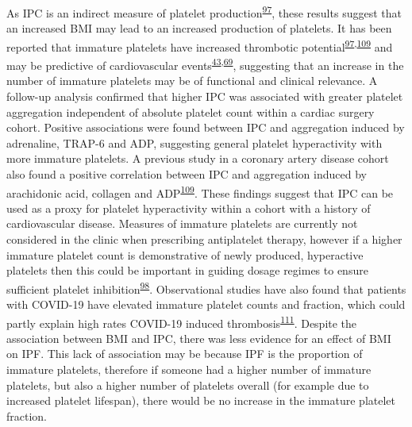 \documentclass[11pt,twoside]{bristolthesis}
\begin{document}
As IPC is an indirect measure of platelet production\textsuperscript{\protect\hyperlink{ref-Lev2016a}{97}}, these results suggest that an increased BMI may lead to an increased production of platelets. It has been reported that immature platelets have increased thrombotic potential\textsuperscript{\protect\hyperlink{ref-Lev2016a}{97},\protect\hyperlink{ref-Grove2011a}{109}} and may be predictive of cardiovascular events\textsuperscript{\protect\hyperlink{ref-Freynhofer2017a}{43},\protect\hyperlink{ref-Ibrahim2014}{69}}, suggesting that an increase in the number of immature platelets may be of functional and clinical relevance. A follow-up analysis confirmed that higher IPC was associated with greater platelet aggregation independent of absolute platelet count within a cardiac surgery cohort. Positive associations were found between IPC and aggregation induced by adrenaline, TRAP-6 and ADP, suggesting general platelet hyperactivity with more immature platelets. A previous study in a coronary artery disease cohort also found a positive correlation between IPC and aggregation induced by arachidonic acid, collagen and ADP\textsuperscript{\protect\hyperlink{ref-Grove2011a}{109}}. These findings suggest that IPC can be used as a proxy for platelet hyperactivity within a cohort with a history of cardiovascular disease. Measures of immature platelets are currently not considered in the clinic when prescribing antiplatelet therapy, however if a higher immature platelet count is demonstrative of newly produced, hyperactive platelets then this could be important in guiding dosage regimes to ensure sufficient platelet inhibition\textsuperscript{\protect\hyperlink{ref-Bernlochner2015a}{98}}. Observational studies have also found that patients with COVID-19 have elevated immature platelet counts and fraction, which could partly explain high rates COVID-19 induced thrombosis\textsuperscript{\protect\hyperlink{ref-Klok2020}{111}}. Despite the association between BMI and IPC, there was less evidence for an effect of BMI on IPF. This lack of association may be because IPF is the proportion of immature platelets, therefore if someone had a higher number of immature platelets, but also a higher number of platelets overall (for example due to increased platelet lifespan), there would be no increase in the immature platelet fraction.
\end{document}
